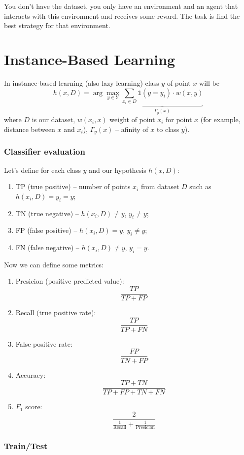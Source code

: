 You don't have the dataset, you only have an environment and an agent that interacts with this environment and receives some revard. The task is find the best strategy for that environment.

\section{Instance-Based Learning}

In instance-based learning (also lazy learning) class $y$ of point $x$ will be
$$h(x, D)=\arg\max\limits_{y\in Y}\underbrace{\sum\limits_{x_i\in D}\mathbb{1}(y=y_i)\cdot w(x,y)}_{\Gamma_y(x)}$$
where $D$ is our dataset, $w(x_i,x)$ weight of point $x_i$ for point $x$ (for example, distance between $x$ and $x_i$), $\Gamma_y(x)$ -- afinity of $x$ to class $y$). \\


\subsubsection*{Classifier evaluation}

Let's define for each class $y$ and our hypothesis $h(x, D)$:
\begin{enumerate}[label=$\bullet$]
	\item TP (true positive) -- number of points $x_i$ from dataset $D$ such as $h(x_i, D)=y_i=y$;
	\item TN (true negative) -- $h(x_i, D)\ne y$, $y_i\ne y$;
	\item FP (false positive) -- $h(x_i, D)=y$, $y_i\ne y$;
	\item FN (false negative) -- $h(x_i, D)\ne y$, $y_i=y$.
\end{enumerate}
Now we can define some metrics:
\begin{enumerate}[label=$\bullet$]
	\item Presicion (positive predicted value): $$\frac{TP}{TP + FP}$$
	\item Recall (true positive rate): $$\frac{TP}{TP+FN}$$
	\item False positive rate: $$\frac{FP}{TN+FP}$$
	\item Accuracy: $$\frac{TP+TN}{TP+FP+TN+FN}$$
	\item $F_1$ score: $$\frac{2}{\frac{1}{\text{Recall}}+\frac{1}{\text{Presicion}}}$$
\end{enumerate}

\subsubsection*{Train/Test}

